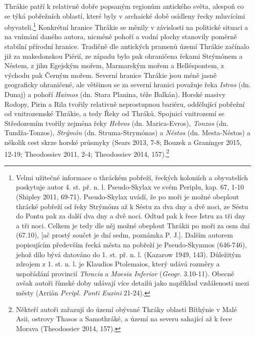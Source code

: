Thrákie patří k relativně dobře popsaným regionům antického světa, alespoň co se týká pobřežních oblastí, které byly v archaické době osídleny řecky mluvícími obyvateli.\footnote{Velmi užitečné informace o thráckém pobřeží, řeckých koloniích a obyvatelích poskytuje autor 4. st. př. n. l. Pseudo-Skylax ve svém Periplu, kap. 67, 1-10 (Shipley 2011, 69-71). Pseudo-Skylax uvádí, že po moři je možné obeplout thrácké pobřeží od řeky Strýmónu až k Séstu za dva dny a dvě noci, ze Séstu do Pontu pak za další dva dny a dvě noci. Odtud pak k řece Istru za tři dny a tři noci. Celkem je tedy dle něj možné obeplout Thrákii po moři za osm dní (67.10), {[}ač prostý součet je dní sedm, poznámka P. J.{]}. Dalším autorem popisujícím především řecká města na pobřeží je Pseudo-Skymnos (646-746), jehož dílo bývá datováno do 1. st. př. n. l. (Kazarow 1949, 143). Důležitým zdrojem z 1. st. n. l. je Klaudios Ptolemaios, který udává rozměry a uspořádání provincií {\em Thracia} a {\em Moesia Inferior} ({\em Geogr}. 3.10-11). Obecně avšak autoři římské doby udávají více detailů jako například vzdálenosti mezi městy (Arrián {\em Peripl. Ponti Euxini} 21-24).} Konkrétní hranice Thrákie se měnily v závislosti na politické situaci a na vnímání daného autora, nicméně pohoří a vodní plochy stanovily poměrně stabilní přírodní hranice. Tradičně dle antických pramenů území Thrákie začínalo již za makedonskou Piérií, ze západu bylo pak ohraničena řekami Strýmónem a Néstem, z jihu Egejským mořem, Marmarským mořem a Helléspontem, z východu pak Černým mořem. Severní hranice Thrákie jsou méně jasně geograficky ohraničené, ale většinou se za severní hranici považuje řeka {\em Istros} (dn. Dunaj) a pohoří {\em Haimos} (dn. Stara Planina, téže Balkán). Horské masivy Rodopy, Pirin a Rila tvořily relativně neprostupnou bariéru, oddělující pobřežní od vnitrozemské Thrákie, a tedy Řeky od Thráků. Spojnicí vnitrozemí se Středozemím tvořily zejména řeky {\em Hebros} (dn. Marica-Evros), {\em Tonzos} (dn. Tundža-Tonzos), {\em Strýmón} (dn. Struma-Strymónas) a {\em Néstos} (dn. Mesta-Néstos) a několik cest skrze horské průsmyky (Sears 2013, 7-8; Bouzek a Graninger 2015, 12-19; Theodossiev 2011, 2-4; Theodossiev 2014, 157).\footnote{Někteří autoři zařazují do území obývané Thráky oblasti Bíthýnie v Malé Asii, ostrovy Thasos a Samothráké, a území na severu sahající až k řece Morava (Theodossiev 2014, 157).}

